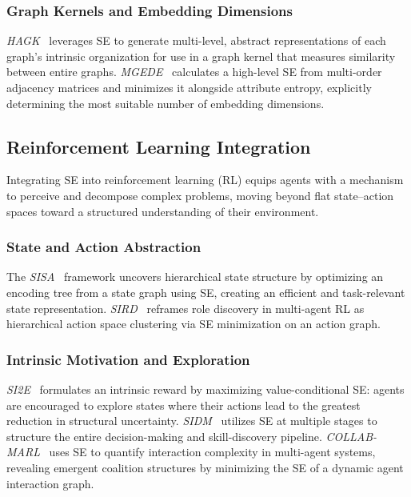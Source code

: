 \subsubsection{Graph Kernels and Embedding Dimensions}

\emph{HAGK}~\cite{yang2024graphkernal} leverages SE to generate multi-level,
abstract representations of each graph's intrinsic organization for use in a
graph kernel that measures similarity between entire graphs.
\emph{MGEDE}~\cite{yang2023MGEDE} calculates a high-level SE from multi-order
adjacency matrices and minimizes it alongside attribute entropy, explicitly
determining the most suitable number of embedding dimensions.

\subsection{Reinforcement Learning Integration}
\label{subsec:rl-methods}

Integrating SE into reinforcement learning (RL) equips agents with a mechanism
to perceive and decompose complex problems, moving beyond flat state--action
spaces toward a structured understanding of their environment.

\subsubsection{State and Action Abstraction}

The \emph{SISA}~\cite{zeng2023hierarchicalSISA} framework uncovers hierarchical
state structure by optimizing an encoding tree from a state graph using SE,
creating an efficient and task-relevant state representation.
\emph{SIRD}~\cite{zeng2023effective} reframes role discovery in multi-agent RL
as hierarchical action space clustering via SE minimization on an action graph.

\subsubsection{Intrinsic Motivation and Exploration}

\emph{SI2E}~\cite{zeng2024effectiveSI2E} formulates an intrinsic reward by
maximizing value-conditional SE: agents are encouraged to explore states where
their actions lead to the greatest reduction in structural uncertainty.
\emph{SIDM}~\cite{zeng2025sidmJMLR} utilizes SE at multiple stages to
structure the entire decision-making and skill-discovery pipeline.
\emph{COLLAB-MARL}~\cite{su2025emergencecollab} uses SE to quantify
interaction complexity in multi-agent systems, revealing emergent coalition
structures by minimizing the SE of a dynamic agent interaction graph.

